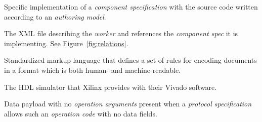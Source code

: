 \begin{description}[style=nextline]
\item[Worker]
Specific implementation of a \textit{component specification} with the source code written according to an \textit{authoring model}.

\item[Worker Description (OWD)]
The XML file describing the \textit{worker} and references the \textit{component spec} it is implementing. See Figure~\ref{fig:relations}.


\item[XML]
Standardized markup language that defines a set of rules for encoding documents in a format which is both human- and machine-readable.

\item[xsim] The HDL simulator that Xilinx provides with their Vivado software.

\item[Zero Length Message]
Data payload with no \textit{operation arguments} present when a \textit{protocol specification} allows such an \textit{operation code} with no data fields.
\end{description}

